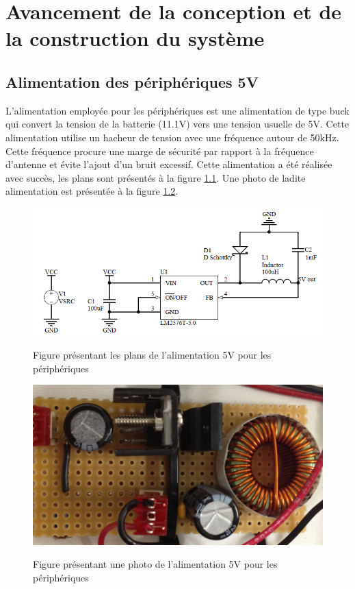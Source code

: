 


\chapter{Avancement de la conception et de la construction du système}
\label{s:avancement}
\section{Alimentation des périphériques 5V}
L'alimentation employée pour les périphériques est une alimentation de type buck qui convert la tension de la batterie (11.1V) vers une tension usuelle de 5V. Cette alimentation utilise un hacheur de tension avec une fréquence autour de 50kHz. Cette fréquence procure une marge de sécurité par rapport à la fréquence d'antenne et évite l'ajout d'un bruit excessif. Cette alimentation a été réalisée avec succès, les plans sont présentés à la figure \ref{fig:alim5V}. Une photo de ladite alimentation est présentée à la figure \ref{fig:alim5Vphoto}.

\begin{figure}[htbp]
\centering
\includegraphics[scale=0.5]{fig/alim_5V.png}
\label{fig:alim5V}
\caption{Figure présentant les plans de l'alimentation 5V pour les périphériques}
\end{figure}

\begin{figure}[htbp]
\centering
\includegraphics[scale=0.2]{fig/alim_5V_photo.png}
\label{fig:alim5Vphoto}
\caption{Figure présentant une photo de l'alimentation 5V pour les périphériques}
\end{figure}

